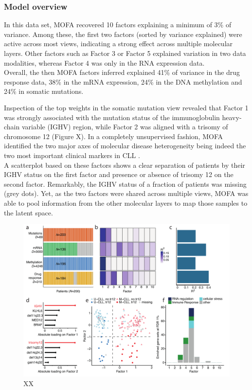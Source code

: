 \subsubsection{Model overview}
In this data set, MOFA recovered 10 factors explaining a minimum of 3\% of variance. Among these, the first two factors (sorted by variance explained) were active across most views, indicating a strong effect across multiple molecular layers. Other factors such as Factor 3 or Factor 5 explained variation in two data modalities, whereas Factor 4 was only in the RNA expression data.\\
Overall, the then MOFA factors inferred explained 41\% of variance in the drug response data, 38\% in the mRNA expression, 24\% in the DNA methylation and 24\% in somatic mutations.

Inspection of the top weights in the somatic mutation view revealed that Factor 1 was strongly associated with the mutation status of the immunoglobulin heavy-chain variable (IGHV) region, while Factor 2 was aligned with a trisomy of chromosome 12 (Figure X). In a completely unsupervised fashion, MOFA identified the two major axes of molecular disease heterogeneity being indeed the two most important clinical markers in CLL \cite{Fabbri2016,Zenz2010}.\\
A scatterplot based on these factors shows a clear separation of patients by their IGHV status on the first factor and presence or absence of trisomy 12 on the second factor. Remarkably, the IGHV status of a fraction of patients was missing (grey dots). Yet, as the two factors were shared across multiple views, MOFA was able to pool information from the other molecular layers to map those samples to the latent space.

\begin{figure}[H]
	\centering 	
	\includegraphics[width=1.0\textwidth]{MOFA_CLL_Figure1}
	\caption{XX}
	\label{fig:MOFA_CLL_Figure1}
\end{figure}

